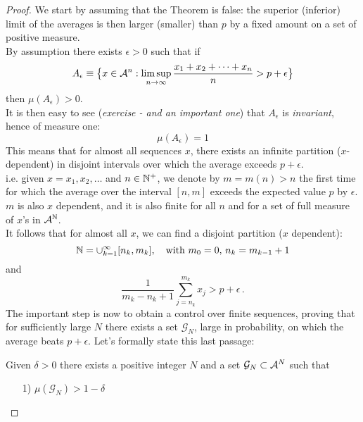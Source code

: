 \begin{proof}
    We start by assuming that the Theorem is false: the superior (inferior) limit of the averages is then larger (smaller) than $p$ by a fixed amount on a set of positive measure.
    \\By assumption there exists $\epsilon>0$ such that if 
    \begin{equation*}
        A_\epsilon \equiv \big\{ x \in \mathcal{A}^n : \limsup_{n \rightarrow \infty} \frac{x_1 + x_2 +\dots+ x_n}{n} > p + \epsilon \big\}
    \end{equation*}
    then $\mu(A_\epsilon) > 0$.
    \\It is then easy to see (\textit{exercise - and an important one}) that $A_\epsilon$ is \textit{invariant}, hence of measure one: 
    \begin{equation*}
        \mu(A_\epsilon) = 1
    \end{equation*}
    This means that for almost all sequences $x$, there exists an infinite partition ($x$-dependent) in disjoint intervals over which the average exceeds $p+\epsilon$.
    \\i.e. given $x= x_1, x_2, \dots $ and $n \in \mathbb{N}^+$, we denote by $m=m(n) > n$ the first time
    for which the average over the interval $[n, m]$ exceeds the expected value $p$ by $\epsilon$. 
    \\$m$ is also $x$ dependent, and it is also finite for all $n$ and for a set of full measure of $x$'s in $\mathcal{A}^{\mathbb{N}}$.
    \\It follows that for almost all $x$, we can find a disjoint partition ($x$ dependent):
    \begin{equation*}
        \mathbb{N} = \cup_{k=1}^\infty [n_k, m_k], \quad \text{with} \, \, m_0 = 0, \, n_k = m_{k-1}+1
    \end{equation*}
    and 
    \begin{equation*}
        \frac{1}{m_k - n_k + 1} \sum_{j=n_k}^{m_k} x_j > p + \epsilon \, .
    \end{equation*}
    The important step is now to obtain a control over finite sequences, proving that for sufficiently large $N$ there exists a set $\mathcal{G}_N$, large in probability, on which the average beats $p+\epsilon$.
    Let's formally state this last passage: 
    \begin{lemma}
    \label{lemma:ergodic_th}
        Given $\delta>0$ there exists a positive integer $N$ and a set $\mathcal{G}_N \subset \mathcal{A}^N$ such that
        \begin{itemize}
            \item[1)] $\mu(\mathcal{G}_N)> 1 - \delta$

\end{itemize}
\end{lemma}
\end{proof}
